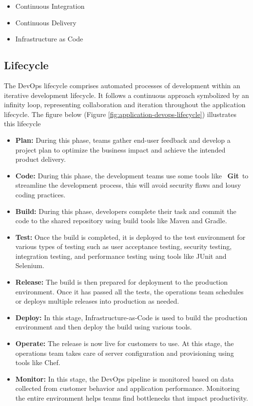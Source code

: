 \begin{itemize}
  \item Continuous Integration
  \item Continuous Delivery
  \item Infrastructure as Code
\end{itemize}


\subsection{Lifecycle}

The DevOps lifecycle comprises automated processes of development within an iterative development lifecycle. It follows a continuous approach symbolized by an infinity loop, representing collaboration and iteration throughout the application lifecycle. The figure below (Figure \ref{fig:application-devops-lifecycle}) illustrates this lifecycle
\begin{itemize}
  \item \textbf{Plan:} During this phase, teams gather end-user feedback and develop a project plan to optimize the business impact and achieve the intended product delivery.
  \item \textbf{Code:} During this phase, the development teams use some tools like  \textbf{Git} to streamline the development process, this will avoid security flaws and lousy coding practices.
  \item \textbf{Build:} During this phase, developers complete their task and  commit the code to the shared repository using build tools like Maven and Gradle.
  \item \textbf{Test:} Once the build is completed, it is deployed to the test environment for various types of testing such as user acceptance testing, security testing, integration testing, and performance testing using tools like JUnit and Selenium.
  \item \textbf{Release:} The build is then prepared for deployment to the production environment. Once it has passed all the tests, the operations team schedules or deploys multiple releases into production as needed.
  \item \textbf{Deploy:} In this stage, Infrastructure-as-Code is used to build the production environment and then deploy the build using various tools.
  \item \textbf{Operate:} The release is now live for customers to use. At this stage, the operations team takes care of server configuration and provisioning using tools like Chef.
  \item \textbf{Monitor:} In this stage, the DevOps pipeline is monitored based on data collected from customer behavior and application performance. Monitoring the entire environment helps teams find bottlenecks that impact productivity.
\end{itemize}

